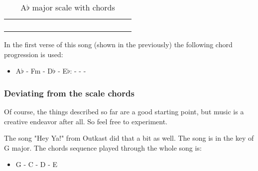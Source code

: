 \begin{table}[h]
	\centering
	\begin{NiceTabular}{*{16}{P{0.05mm}}}
		\Block{}{} &  & &  & &  & &  & &  & &  & &  & & \Block{}{} \\
		 & &  & &  & &  & &  & &  & &  & &  & \\
		 & &  & &  & &  & &  & &  & &  & & \\
		 & &  & &  & &  & &  & &  & &  & &  &
	\end{NiceTabular}
	\caption{A$\flat$ major scale with chords}
	\label{tab:guitar_a_flat_major_scale_with_chords}
\end{table}

In the first verse of this song (shown in the previously) the following chord progression is used:

\begin{itemize}
	\item A$\flat$ - Fm - D$\flat$ - E$\flat$:  -  -  - 
\end{itemize}

\newpage

\subsubsection{Deviating from the scale chords}

Of course, the things described so far are a good starting point, but music is a creative endeavor after all. So feel free to experiment.

The song "Hey Ya!" from Outkast did that a bit as well. The song is in the key of G major. The chords sequence played through the whole song is:
\begin{itemize}
	\item G - C - D - E
\end{itemize}

